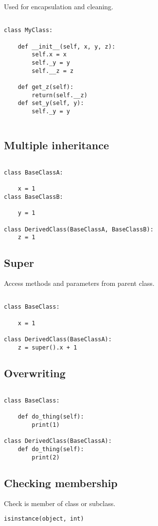 Used for encapsulation and cleaning.

\begin{verbatim}

class MyClass:

    def __init__(self, x, y, z):
        self.x = x
        self._y = y
        self.__z = z

    def get_z(self):
        return(self.__z)
    def set_y(self, y):
        self._y = y
        
\end{verbatim}


\subsection{Multiple inheritance}

\begin{verbatim}

class BaseClassA:

    x = 1
class BaseClassB:

    y = 1

class DerivedClass(BaseClassA, BaseClassB):
    z = 1

\end{verbatim}

\subsection{Super}
Access methods and parameters from parent class.

\begin{verbatim}

class BaseClass:

    x = 1

class DerivedClass(BaseClassA):
    z = super().x + 1

\end{verbatim}

\subsection{Overwriting}

\begin{verbatim}

class BaseClass:

    def do_thing(self):
        print(1)

class DerivedClass(BaseClassA):
    def do_thing(self):
        print(2)

\end{verbatim}

\subsection{Checking membership}

Check is member of class or subclass.

\begin{verbatim}
isinstance(object, int)
\end{verbatim}

